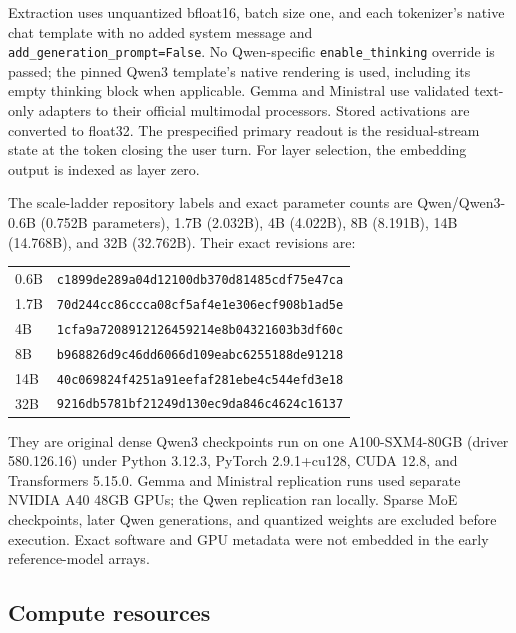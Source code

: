 \documentclass{article}
\begin{document}
Extraction uses unquantized bfloat16, batch size one, and each tokenizer's
native chat template with no added system message and
\texttt{add\_generation\_prompt=False}. No Qwen-specific
\texttt{enable\_thinking} override is passed; the pinned Qwen3 template's
native rendering is used, including its empty thinking block when applicable.
Gemma and Ministral use validated text-only adapters to their official
multimodal processors. Stored activations are converted to float32. The
prespecified primary readout is the residual-stream state at the token closing
the user turn. For layer selection, the embedding output is indexed as layer
zero.

The scale-ladder repository labels and exact parameter counts are Qwen/Qwen3-
0.6B (0.752B parameters), 1.7B (2.032B), 4B (4.022B), 8B (8.191B), 14B
(14.768B), and 32B (32.762B). Their exact revisions are:
\begin{center}
\footnotesize
\begin{tabular}{ll}
0.6B & \texttt{c1899de289a04d12100db370d81485cdf75e47ca} \\
1.7B & \texttt{70d244cc86ccca08cf5af4e1e306ecf908b1ad5e} \\
4B & \texttt{1cfa9a7208912126459214e8b04321603b3df60c} \\
8B & \texttt{b968826d9c46dd6066d109eabc6255188de91218} \\
14B & \texttt{40c069824f4251a91eefaf281ebe4c544efd3e18} \\
32B & \texttt{9216db5781bf21249d130ec9da846c4624c16137}
\end{tabular}
\end{center}
They are original dense Qwen3 checkpoints run on one A100-SXM4-80GB (driver
580.126.16) under Python
3.12.3, PyTorch 2.9.1+cu128, CUDA 12.8, and Transformers 5.15.0. Gemma and
Ministral replication runs used separate NVIDIA A40 48GB GPUs; the Qwen
replication ran locally. Sparse MoE checkpoints, later Qwen generations, and
quantized weights are excluded before execution. Exact software and GPU
metadata were not embedded in the early reference-model arrays.

\subsection{Compute resources}
\end{document}
